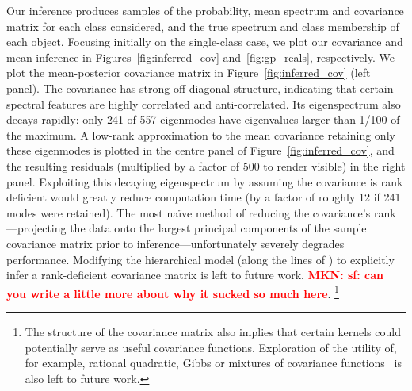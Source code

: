 \documentclass[a4paper,fleqn,usenatbib]{mnras}
\newcommand{\mkn}[1]{\textbf{\textcolor{red}{MKN: #1}}}
\begin{document}
Our inference produces samples of the probability, mean spectrum and covariance matrix for each class considered, and the true spectrum and class membership of each object. Focusing initially on the single-class case, we plot our covariance and mean inference in Figures~\ref{fig:inferred_cov} and~\ref{fig:gp_reals}, respectively. We plot the mean-posterior covariance matrix in Figure~\ref{fig:inferred_cov} (left panel). The covariance has strong off-diagonal structure, indicating that certain spectral features are highly correlated and anti-correlated. Its eigenspectrum also decays rapidly: only 241 of 557 eigenmodes have eigenvalues larger than 1/100 of the maximum. A low-rank approximation to the mean covariance retaining only these eigenmodes is plotted in the centre panel of Figure~\ref{fig:inferred_cov}, and the resulting residuals (multiplied by a factor of 500 to render visible) in the right panel. Exploiting this decaying eigenspectrum by assuming the covariance is rank deficient would greatly reduce computation time (by a factor of roughly 12 if 241 modes were retained). The most na\"ive method of reducing the covariance's rank---projecting the data onto the largest principal components of the sample covariance matrix prior to inference---unfortunately severely degrades performance. Modifying the hierarchical model (along the lines of \citet{Zhang_etal:2013}) to explicitly infer a rank-deficient covariance matrix is left to future work. \mkn{ sf: can you write a little more about why it sucked so much here}. \footnote{The structure of the covariance matrix also implies that certain kernels could potentially serve as useful covariance functions. Exploration of the utility of, for example, rational quadratic, Gibbs or mixtures of covariance functions~\citep{Rasmussen_Williams} is also left to future work.}
\end{document}
